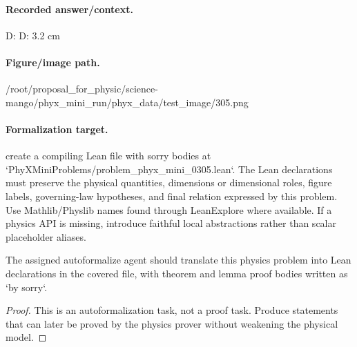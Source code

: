 \paragraph{Recorded answer/context.}
D: D: 3.2 cm

\paragraph{Figure/image path.}
/root/proposal\_for\_physic/science-mango/phyx\_mini\_run/phyx\_data/test\_image/305.png

\paragraph{Formalization target.}
create a compiling Lean file with sorry bodies at `PhyXMiniProblems/problem\_phyx\_mini\_0305.lean`. The Lean declarations must preserve the physical quantities, dimensions or dimensional roles, figure labels, governing-law hypotheses, and final relation expressed by this problem.
Use Mathlib/Physlib names found through LeanExplore where available. If a physics API is missing, introduce faithful local abstractions rather than scalar placeholder aliases.

\begin{theorem}
\label{thm:physics:phyx_mini_0305:target}
The assigned autoformalize agent should translate this physics problem into Lean declarations in the covered file, with theorem and lemma proof bodies written as `by sorry`.
\end{theorem}
\begin{proof}
This is an autoformalization task, not a proof task. Produce statements that can later be proved by the physics prover without weakening the physical model.
\end{proof}

